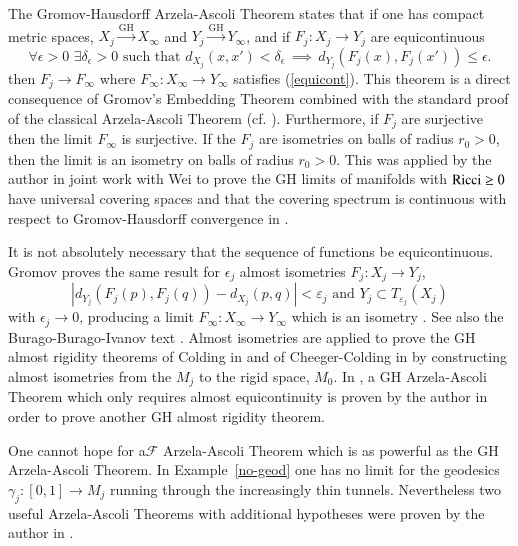 \documentclass[12pt]{amsart}
\begin{document}
The Gromov-Hausdorff Arzela-Ascoli Theorem states that if
one has compact metric spaces, $X_j {\stackrel { \textrm{GH}}{\longrightarrow} } X_\infty$
and $Y_j {\stackrel { \textrm{GH}}{\longrightarrow} } Y_\infty$, and if $F_j: X_j \to Y_j$ are equicontinuous
\begin{equation}\label{equicont}
\forall \epsilon>0 \,\,\exists \delta_\epsilon>0\textrm{ such that }
d_{X_j}(x,x')< \delta_\epsilon \,\implies \,
d_{Y_j}(F_j(x), F_j(x'))\le \epsilon.
\end{equation}
then $F_j \to F_\infty$ where $F_\infty: X_\infty\to Y_\infty$
satisfies (\ref{equicont}).  This theorem is a direct consequence of
Gromov's Embedding Theorem combined with the standard proof
of the classical Arzela-Ascoli Theorem (cf. \cite{Sormani-AA}).  Furthermore, if $F_j$ are surjective
then the limit $F_\infty$ is surjective.  If the $F_j$ are 
isometries on balls of radius $r_0>0$,
then the limit is an isometry on balls of radius $r_0>0$.  This was
applied by the author in joint work with Wei to prove the GH
limits of manifolds with ${\rm{Ricci}}\ge 0$ have
universal covering spaces \cite{SorWei1} and that the
covering spectrum is continuous with respect to Gromov-Hausdorff
convergence in \cite{SorWei3}.   

It is not absolutely necessary that the sequence of functions be
equicontinuous.  Gromov proves the same result for $\epsilon_j$
almost isometries $F_j: X_j \to Y_j$,
\begin{equation}
|d_{Y_j}(F_j(p),F_j(q)) -d_{X_j}(p,q)|<\varepsilon_j \textrm{ and } 
Y_j \subset T_{\varepsilon_j}(X_j)
\end{equation}
with $\epsilon_j \to 0$, producing a limit $F_\infty: X_\infty\to Y_\infty$
which is an isometry \cite{Gromov-metric}.  See also the Burago-Burago-Ivanov text 
\cite{BBI}.   Almost isometries are applied to prove
the GH almost rigidity theorems of Colding in \cite{Colding-volume} and 
of Cheeger-Colding in \cite{ChCo-almost-rigidity}
by constructing almost isometries from the $M_j$ to the rigid space,
$M_0$.  In \cite{Sor-cosmos}, a GH Arzela-Ascoli Theorem which only requires
almost equicontinuity is proven by the author in order to prove another
GH almost rigidity theorem. 

One cannot hope for a$\mathcal{F}$ Arzela-Ascoli Theorem which is as powerful as the GH Arzela-Ascoli Theorem.  In Example~\ref{no-geod}
one has no limit for the geodesics $\gamma_j:[0,1] \to M_j$ running through
the increasingly thin tunnels.  Nevertheless two useful Arzela-Ascoli Theorems 
with additional hypotheses were proven by the author in \cite{Sormani-AA}.
\end{document}
